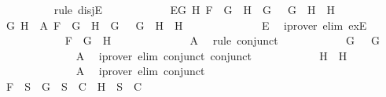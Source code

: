 \begin{isabellebody}
\ \ \ \ \ \ \ \ \isamarkupfalse%
\ {\isacharparenleft}rule\ disjE{\isacharparenright}\isanewline
\ \ \ \ \ \ \ \ \ \ \isamarkupfalse%
\ E{}{\isacharcolon}{\isachardoublequoteopen}{\isasymexists}G{}\ H{}{\isachardot}\ F\ {\isacharequal}\ {\isacharparenleft}G{}\ \isactrlbold {\isasymrightarrow}\ H{}{\isacharparenright}\ {\isasymand}\ G\ {\isacharequal}\ \isactrlbold {\isasymnot}\ G{}\ {\isasymand}\ H\ {\isacharequal}\ H{}{\isachardoublequoteclose}\isanewline
\ \ \ \ \ \ \ \ \ \ \isamarkupfalse%
\ G{}\ H{}\ \ A{}{\isacharcolon}{\isachardoublequoteopen}\ F\ {\isacharequal}\ {\isacharparenleft}G{}\ \isactrlbold {\isasymrightarrow}\ H{}{\isacharparenright}\ {\isasymand}\ G\ {\isacharequal}\ \isactrlbold {\isasymnot}\ G{}\ {\isasymand}\ H\ {\isacharequal}\ H{}{\isachardoublequoteclose}\isanewline
\ \ \ \ \ \ \ \ \ \ \ \ \isamarkupfalse%
\ E{}\ \isamarkupfalse%
\ {\isacharparenleft}iprover\ elim{\isacharcolon}\ exE{\isacharparenright}\isanewline
\ \ \ \ \ \ \ \ \ \ \isamarkupfalse%
\ {\isachardoublequoteopen}F\ {\isacharequal}\ {\isacharparenleft}G{}\ \isactrlbold {\isasymrightarrow}\ H{}{\isacharparenright}{\isachardoublequoteclose}\isanewline
\ \ \ \ \ \ \ \ \ \ \ \ \isamarkupfalse%
\ A{}\ \isamarkupfalse%
\ {\isacharparenleft}rule\ conjunct{}{\isacharparenright}\isanewline
\ \ \ \ \ \ \ \ \ \ \isamarkupfalse%
\ {\isachardoublequoteopen}G\ {\isacharequal}\ \isactrlbold {\isasymnot}\ G{}{\isachardoublequoteclose}\isanewline
\ \ \ \ \ \ \ \ \ \ \ \ \isamarkupfalse%
\ A{}\ \isamarkupfalse%
\ {\isacharparenleft}iprover\ elim{\isacharcolon}\ conjunct{}\ conjunct{}{\isacharparenright}\isanewline
\ \ \ \ \ \ \ \ \ \ \isamarkupfalse%
\ {\isachardoublequoteopen}H\ {\isacharequal}\ H{}{\isachardoublequoteclose}\isanewline
\ \ \ \ \ \ \ \ \ \ \ \ \isamarkupfalse%
\ A{}\ \isamarkupfalse%
\ {\isacharparenleft}iprover\ elim{\isacharcolon}\ conjunct{}{\isacharparenright}\isanewline
\ \ \ \ \ \ \ \ \ \ \isamarkupfalse%
\ {\isachardoublequoteopen}F\ {\isasymin}\ S\ {\isasymlongrightarrow}\ {\isacharbraceleft}G{\isacharbraceright}\ {\isasymunion}\ S\ {\isasymin}\ C\ {\isasymor}\ {\isacharbraceleft}H{\isacharbraceright}\ {\isasymunion}\ S\ {\isasymin}\ C{\isachardoublequoteclose}\isanewline

\end{isabellebody}
